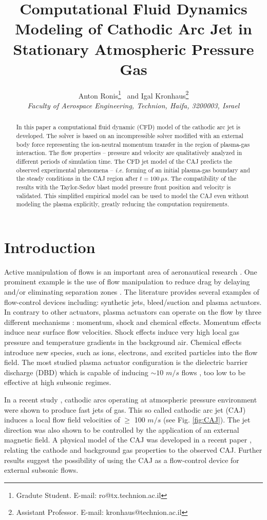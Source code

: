 \documentclass[a4paper]{iacas}%
\title{Computational Fluid Dynamics Modeling of Cathodic Arc Jet in Stationary Atmospheric Pressure Gas}
\author{%
	Anton Ronis\thanks{Gradute Student. E-mail: ro@tx.technion.ac.il}
	\ and
	Igal Kronhaus\thanks{Assistant Professor. E-mail: kronhaus@technion.ac.il}\\
	{\normalsize\itshape
		Faculty of Aerospace Engineering, Technion, Haifa,
		3200003, Israel}
}
\begin{document}
	
	\maketitle
	
	\begin{abstract}
		In this paper a computational fluid dynamic (CFD) model of the cathodic arc jet is developed. The solver is based on an incompressible solver modified with an external body force representing the ion-neutral momentum transfer in the region of plasma-gas interaction.
		The flow properties -- pressure and velocity are qualitatively analyzed in different periods of simulation time. 
		The CFD jet model of the CAJ predicts the observed experimental phenomena -- \emph{i.e.} forming of an initial plasma-gas boundary and the steady conditions in the CAJ region after $t = 100~\mu s$. The compatibility of the results with the Taylor-Sedov blast model pressure front position and velocity is validated. This simplified empirical model can be used to model the CAJ even without modeling the plasma explicitly, greatly reducing the computation requirements.
		 
	\end{abstract}

\section{Introduction}
Active manipulation of flows is an important area of aeronautical research \cite{GADEL}. One prominent example is the use of flow manipulation to reduce drag by delaying and/or eliminating separation zones \cite{SIMPSON}. The literature provides several examples of flow-control devices including: synthetic jets, bleed/suction and plasma actuators.
In contrary to other actuators, plasma actuators can operate on the flow by three different mechanisms \cite{FLOWCTRL}: momentum, shock and chemical effects. Momentum effects induce near surface flow velocities. Shock effects induce very high local gas pressure and temperature gradients in the background air. Chemical effects introduce new species, such as ions, electrons, and excited particles into the flow field. The most studied plasma actuator configuration is the dielectric barrier discharge (DBD) which is capable of inducing $\sim10$ $m/s$ flows \cite{FLOWCTRL,KOK,WHALLEY,MOREAU}, too low to be effective at high subsonic regimes.

In a recent study \cite{KR}, cathodic arcs operating at atmospheric pressure environment were shown to produce fast jets of gas. This so called cathodic arc jet (CAJ) induces a local flow field velocities of $\ge$ 100 $m/s$ (see Fig. \ref{fig:CAJ}). The jet direction was also shown to be controlled by the application of an external magnetic field. A physical model of the CAJ was developed in a recent paper \cite{KRClose}, relating the cathode and background gas properties to the observed CAJ. Further results suggest the possibility of using the CAJ as a flow-control device for external subsonic flows\cite{KRFar}.
\end{document}
